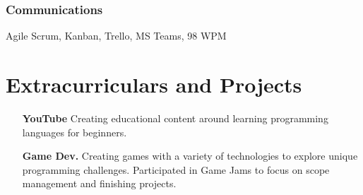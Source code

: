 \documentclass{article}
\begin{document}
\subsubsection{Communications} Agile Scrum, Kanban, Trello, MS Teams,  98 WPM

\section{Extracurriculars and Projects}
\begin{itemize}
  \item[\bfseries YouTube] Creating educational content around learning programming languages for beginners.
  \item[\bfseries Game Dev.] Creating games with a variety of technologies to explore unique programming challenges. Participated in Game Jams to focus on scope management and finishing projects.
\end{itemize}

\thispagestyle{empty}
\end{document}
